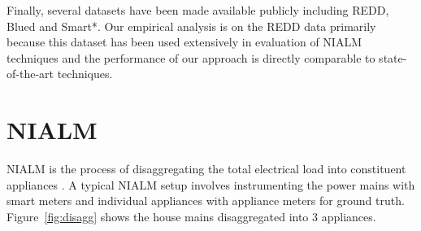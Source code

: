 \documentclass[conference]{IEEEtran}
\newcommand{\figref}[1]{Figure~\ref{#1}}
\begin{document}
Finally, several datasets have been made available publicly including REDD\cite{redd}, Blued\cite{blued_cmu} and Smart*\cite{smart}. Our empirical analysis is on the REDD data primarily because this dataset has been used extensively in evaluation of NIALM techniques and the performance of our approach is directly comparable to state-of-the-art techniques.

\section{NIALM}
NIALM is the process of disaggregating the total electrical load into constituent appliances \cite{hart}. A typical NIALM setup involves instrumenting the power mains with smart meters and individual appliances with appliance meters for ground truth. \figref{fig:disagg} shows the house mains disaggregated into 3 appliances.
\end{document}
